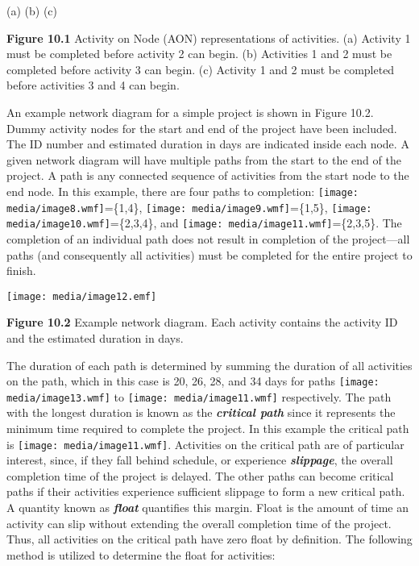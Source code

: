 (a) (b) (c)

\textbf{Figure 10.1} Activity on Node (AON) representations of
activities. (a) Activity 1 must be completed before activity 2 can
begin. (b) Activities 1 and 2 must be completed before activity 3 can
begin. (c) Activity 1 and 2 must be completed before activities 3 and 4
can begin.

An example network diagram for a simple project is shown in Figure 10.2.
Dummy activity nodes for the start and end of the project have been
included. The ID number and estimated duration in days are indicated
inside each node. A given network diagram will have multiple paths from
the start to the end of the project. A path is any connected sequence of
activities from the start node to the end node. In this example, there
are four paths to completion:
\texttt{[image: media/image8.wmf]}=\{1,4\},
\texttt{[image: media/image9.wmf]}=\{1,5\},
\texttt{[image: media/image10.wmf]}=\{2,3,4\},
and
\texttt{[image: media/image11.wmf]}=\{2,3,5\}.
The completion of an individual path does not result in completion of
the project---all paths (and consequently all activities) must be
completed for the entire project to finish.

\texttt{[image: media/image12.emf]}

\textbf{Figure 10.2} Example network diagram. Each activity contains the
activity ID and the estimated duration in days.

The duration of each path is determined by summing the duration of all
activities on the path, which in this case is 20, 26, 28, and 34 days
for paths
\texttt{[image: media/image13.wmf]} to
\texttt{[image: media/image11.wmf]}
respectively. The path with the longest duration is known as the
\emph{\textbf{critical path}} since it represents the minimum time
required to complete the project. In this example the critical path is
\texttt{[image: media/image11.wmf]}.
Activities on the critical path are of particular interest, since, if
they fall behind schedule, or experience \emph{\textbf{slippage}}, the
overall completion time of the project is delayed. The other paths can
become critical paths if their activities experience sufficient slippage
to form a new critical path. A quantity known as \emph{\textbf{float}}
quantifies this margin. Float is the amount of time an activity can slip
without extending the overall completion time of the project. Thus, all
activities on the critical path have zero float by definition. The
following method is utilized to determine the float for activities:

